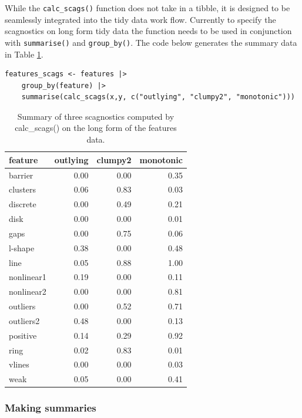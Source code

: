 While the \texttt{calc\_scags()} function does not take in a tibble, it is designed to be seamlessly integrated into the tidy data work flow. Currently to specify the scagnostics on long form tidy data the function needs to be used in conjunction with \texttt{summarise()} and \texttt{group\_by()}. The code below generates the summary data in Table \ref{tab:featuresscags-pdf}.

\begin{verbatim}
features_scags <- features |>
    group_by(feature) |>
    summarise(calc_scags(x,y, c("outlying", "clumpy2", "monotonic")))
\end{verbatim}

\begin{table}

\caption{\label{tab:featuresscags-pdf}Summary of three scagnostics computed by calc\_scags() on the long form of the features data.}
\centering
\begin{tabular}[t]{>{\raggedright\arraybackslash}p{3cm}rrr}
\toprule
feature & outlying & clumpy2 & monotonic\\
\midrule
barrier & 0.00 & 0.00 & 0.35\\
clusters & 0.06 & 0.83 & 0.03\\
discrete & 0.00 & 0.49 & 0.21\\
disk & 0.00 & 0.00 & 0.01\\
gaps & 0.00 & 0.75 & 0.06\\
\addlinespace
l-shape & 0.38 & 0.00 & 0.48\\
line & 0.05 & 0.88 & 1.00\\
nonlinear1 & 0.19 & 0.00 & 0.11\\
nonlinear2 & 0.00 & 0.00 & 0.81\\
outliers & 0.00 & 0.52 & 0.71\\
\addlinespace
outliers2 & 0.48 & 0.00 & 0.13\\
positive & 0.14 & 0.29 & 0.92\\
ring & 0.02 & 0.83 & 0.01\\
vlines & 0.00 & 0.00 & 0.03\\
weak & 0.05 & 0.00 & 0.41\\
\bottomrule
\end{tabular}
\end{table}

\subsubsection{Making summaries}\label{making-summaries}

